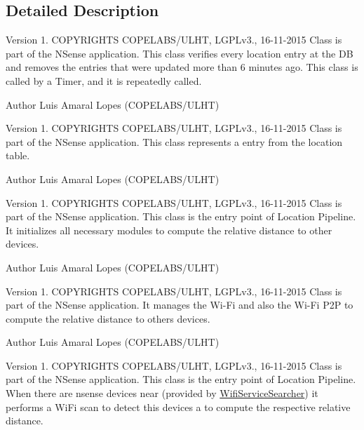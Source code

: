 \subsection{Detailed Description}
\begin{DoxyVersion}{Version}
1. C\-O\-P\-Y\-R\-I\-G\-H\-T\-S C\-O\-P\-E\-L\-A\-B\-S/\-U\-L\-H\-T, L\-G\-P\-Lv3., 16-\/11-\/2015 Class is part of the N\-Sense application. This class verifies every location entry at the D\-B and removes the entries that were updated more than 6 minutes ago. This class is called by a Timer, and it is repeatedly called. 
\end{DoxyVersion}
\begin{DoxyAuthor}{Author}
Luis Amaral Lopes (C\-O\-P\-E\-L\-A\-B\-S/\-U\-L\-H\-T)
\end{DoxyAuthor}
\begin{DoxyVersion}{Version}
1. C\-O\-P\-Y\-R\-I\-G\-H\-T\-S C\-O\-P\-E\-L\-A\-B\-S/\-U\-L\-H\-T, L\-G\-P\-Lv3., 16-\/11-\/2015 Class is part of the N\-Sense application. This class represents a entry from the location table. 
\end{DoxyVersion}
\begin{DoxyAuthor}{Author}
Luis Amaral Lopes (C\-O\-P\-E\-L\-A\-B\-S/\-U\-L\-H\-T)
\end{DoxyAuthor}
\begin{DoxyVersion}{Version}
1. C\-O\-P\-Y\-R\-I\-G\-H\-T\-S C\-O\-P\-E\-L\-A\-B\-S/\-U\-L\-H\-T, L\-G\-P\-Lv3., 16-\/11-\/2015 Class is part of the N\-Sense application. This class is the entry point of Location Pipeline. It initializes all necessary modules to compute the relative distance to other devices. 
\end{DoxyVersion}
\begin{DoxyAuthor}{Author}
Luis Amaral Lopes (C\-O\-P\-E\-L\-A\-B\-S/\-U\-L\-H\-T)
\end{DoxyAuthor}
\begin{DoxyVersion}{Version}
1. C\-O\-P\-Y\-R\-I\-G\-H\-T\-S C\-O\-P\-E\-L\-A\-B\-S/\-U\-L\-H\-T, L\-G\-P\-Lv3., 16-\/11-\/2015 Class is part of the N\-Sense application. It manages the Wi-\/\-Fi and also the Wi-\/\-Fi P2\-P to compute the relative distance to others devices. 
\end{DoxyVersion}
\begin{DoxyAuthor}{Author}
Luis Amaral Lopes (C\-O\-P\-E\-L\-A\-B\-S/\-U\-L\-H\-T)
\end{DoxyAuthor}
\begin{DoxyVersion}{Version}
1. C\-O\-P\-Y\-R\-I\-G\-H\-T\-S C\-O\-P\-E\-L\-A\-B\-S/\-U\-L\-H\-T, L\-G\-P\-Lv3., 16-\/11-\/2015 Class is part of the N\-Sense application. This class is the entry point of Location Pipeline. When there are nsense devices near (provided by \hyperlink{classcs_1_1nsense_1_1location_1_1_wifi_service_searcher}{Wifi\-Service\-Searcher}) it performs a Wi\-Fi scan to detect this devices a to compute the respective relative distance. 
\end{DoxyVersion}
